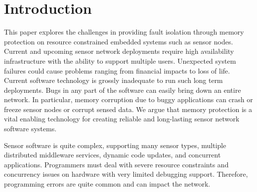 \section{Introduction}
\label{sec:introduction}
%
This paper explores the challenges in providing fault isolation
through memory protection on resource constrained embedded systems
such as sensor nodes.
%
%
%
%
%
Current and upcoming sensor network deployments require high
availability infrastructure with the ability to support multiple users.
%
%
Unexpected system failures could cause problems ranging from financial
impacts to loss of life.
%
Current software technology is grossly inadequate to run such long
term deployments.
%
Bugs in any part of the software can easily bring down an entire network.
%
In particular, memory corruption due to buggy applications can crash or
freeze sensor nodes or corrupt sensed data.
%
We argue that memory protection is a vital enabling technology for
creating reliable and long-lasting sensor network software systems.
%

Sensor software is quite complex, supporting 
%
many sensor types, multiple distributed
middleware services, dynamic code updates, and concurrent applications.
%
Programmers must deal with severe resource constraints and concurrency issues
%
on hardware with very limited debugging support.
%
Therefore, programming errors are quite common and can impact the network.


